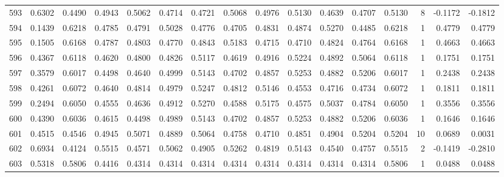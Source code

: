 \begin{tabular}{lrrrrrrrrrrrrrrr}
593 &      0.6302 &  0.4490 &  0.4943 &  0.5062 &  0.4714 &  0.4721 &  0.5068 &  0.4976 &  0.5130 &  0.4639 &   0.4707 &     0.5130 &      8 &                   -0.1172 &                    -0.1812 \\
594 &      0.1439 &  0.6218 &  0.4785 &  0.4791 &  0.5028 &  0.4776 &  0.4705 &  0.4831 &  0.4874 &  0.5270 &   0.4485 &     0.6218 &      1 &                    0.4779 &                     0.4779 \\
595 &      0.1505 &  0.6168 &  0.4787 &  0.4803 &  0.4770 &  0.4843 &  0.5183 &  0.4715 &  0.4710 &  0.4824 &   0.4764 &     0.6168 &      1 &                    0.4663 &                     0.4663 \\
596 &      0.4367 &  0.6118 &  0.4620 &  0.4800 &  0.4826 &  0.5117 &  0.4619 &  0.4916 &  0.5224 &  0.4892 &   0.5064 &     0.6118 &      1 &                    0.1751 &                     0.1751 \\
597 &      0.3579 &  0.6017 &  0.4498 &  0.4640 &  0.4999 &  0.5143 &  0.4702 &  0.4857 &  0.5253 &  0.4882 &   0.5206 &     0.6017 &      1 &                    0.2438 &                     0.2438 \\
598 &      0.4261 &  0.6072 &  0.4640 &  0.4814 &  0.4979 &  0.5247 &  0.4812 &  0.5146 &  0.4553 &  0.4716 &   0.4734 &     0.6072 &      1 &                    0.1811 &                     0.1811 \\
599 &      0.2494 &  0.6050 &  0.4555 &  0.4636 &  0.4912 &  0.5270 &  0.4588 &  0.5175 &  0.4575 &  0.5037 &   0.4784 &     0.6050 &      1 &                    0.3556 &                     0.3556 \\
600 &      0.4390 &  0.6036 &  0.4615 &  0.4498 &  0.4989 &  0.5143 &  0.4702 &  0.4857 &  0.5253 &  0.4882 &   0.5206 &     0.6036 &      1 &                    0.1646 &                     0.1646 \\
601 &      0.4515 &  0.4546 &  0.4945 &  0.5071 &  0.4889 &  0.5064 &  0.4758 &  0.4710 &  0.4851 &  0.4904 &   0.5204 &     0.5204 &     10 &                    0.0689 &                     0.0031 \\
602 &      0.6934 &  0.4124 &  0.5515 &  0.4571 &  0.5062 &  0.4905 &  0.5262 &  0.4819 &  0.5143 &  0.4540 &   0.4757 &     0.5515 &      2 &                   -0.1419 &                    -0.2810 \\
603 &      0.5318 &  0.5806 &  0.4416 &  0.4314 &  0.4314 &  0.4314 &  0.4314 &  0.4314 &  0.4314 &  0.4314 &   0.4314 &     0.5806 &      1 &                    0.0488 &                     0.0488 \\

\end{tabular}
